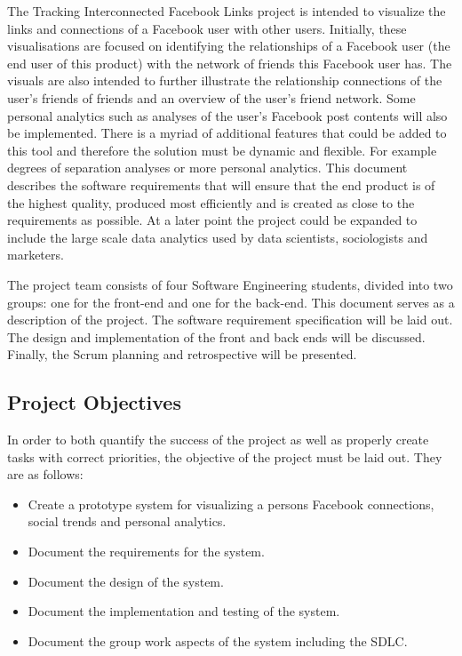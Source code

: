 \documentclass[12pt,onecolumn]{article}
\begin{document}
	The Tracking Interconnected Facebook Links project is intended to visualize the links and connections of a Facebook user with other users. Initially, these visualisations are focused on identifying the relationships of a Facebook user (the end user of this product) with the network of friends this Facebook user has. The visuals are also intended to further illustrate the relationship connections of the user's friends of friends and an overview of the user's friend network. Some personal analytics such as analyses of the user's Facebook post contents will also be implemented. There is a myriad of additional features that could be added to this tool and therefore the solution must be dynamic and flexible. For example degrees of separation analyses or more personal analytics. This document describes the software requirements that will ensure that the end product is of the highest quality, produced most efficiently and is created as close to the requirements as possible. At a later point the project could be expanded to include the large scale data analytics used by data scientists, sociologists and marketers. 

	The project team consists of four Software Engineering students, divided into two groups: one for the front-end and one for the back-end. This document serves as a description of the project. The software requirement specification will be laid out. The design and implementation of the front and back ends will be discussed. Finally, the Scrum planning and retrospective will be presented.

	\subsection{Project Objectives} %

	In order to both quantify the success of the project as well as properly create tasks with correct priorities, the objective of the project must be laid out. They are as follows:

	\begin{itemize}

		\item Create a prototype system for visualizing a persons Facebook connections, social trends and personal analytics.

		\item Document the requirements for the system.

		\item Document the design of the system.

		\item Document the implementation and testing of the system.

		\item Document the group work aspects of the system including the SDLC.

	\end{itemize}
\end{document}
